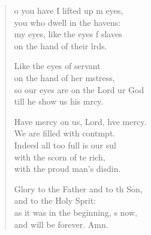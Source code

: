 \settowidth{\versewidth}{so our eyes are on the Lord our God *}
\begin{verse}%
  \begin{patverse}
o you have I lifted up m eyes,\Med\\
you who dwell in the havens:\\
my eyes, like the eyes f slaves\Med\\
on the hand of their lrds.

Like the eyes of  servant\Med\\
on the hand of her m\pointup{\i}stress,\\
so our eyes are on the Lord ur God\Med\\
till he show us his mrcy.

Have mercy on us, Lord, hve mercy.\Med\\
We are filled with contmpt.\\
Indeed all too full is our sul\Flex\\
with the scorn of te rich,\Med\\
with the proud man’s disdin.

Glory to the Father and to th Son,\Med\\
and to the Holy Sp\pointup{\i}rit:\\
as it was in the beginning, \pointup{\i}s now,\Med\\
and will be forever. Amn. 
  \end{patverse}
\end{verse}

